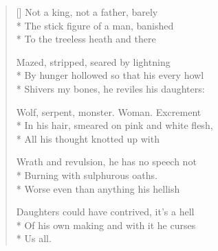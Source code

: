 \label{ch:lear_ba}
\settowidth{\versewidth}{In his hair, smeared on pink and white flesh,}
\begin{verse}[\versewidth]
Not a king, not a father, barely\\*
The stick figure of a man, banished\\*
To the treeless heath and there

Mazed, stripped, seared by lightning\\*
By hunger hollowed so that his every howl\\*
Shivers my bones, he reviles his daughters:

Wolf, serpent, monster.  Woman. Excrement\\*
In his hair, smeared on pink and white flesh,\\*
All his thought knotted up with

Wrath and revulsion, he has no speech not\\*
Burning with sulphurous oaths.\\*
Worse even than anything his hellish

Daughters could have contrived, it's a hell\\*
Of his own making and with it he curses\\*
Us all.
\end{verse}
